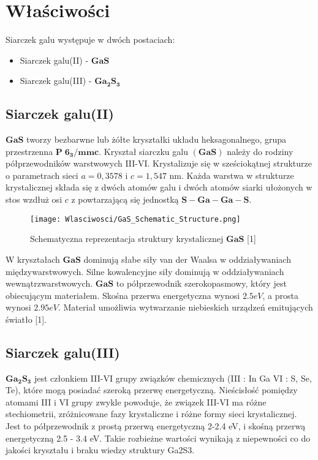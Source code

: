 \newpage

\section{Właściwości}
Siarczek galu występuje w dwóch postaciach:
\begin{itemize}
	\item Siarczek galu(II) - $\mathbf{GaS}$
	\item Siarczek galu(III) - $\mathbf{Ga_{2}S_{3}}$
\end{itemize}

\subsection{Siarczek galu(II)}
$\mathbf{GaS}$ tworzy bezbarwne lub żółte kryształki układu heksagonalnego, grupa przestrzenna
$\mathbf{P\;6_{3}/mmc}$. Kryształ siarczku galu $\mathbf{(GaS)}$ należy do rodziny półprzewodników warstwowych III-VI. Krystalizuje się w sześciokątnej strukturze o parametrach sieci $a = 0,3578$ i $c = 1,547$ nm. Każda warstwa w strukturze krystalicznej składa się z dwóch atomów galu i dwóch atomów siarki ułożonych w stos wzdłuż osi $c$ z powtarzającą się jednostką $\mathbf{S-Ga-Ga-S}$.
\begin{figure}[H]
	\begin{center}
		\texttt{[image: Wlasciwosci/GaS\_Schematic\_Structure.png]}
		\caption{Schematyczna reprezentacja struktury krystalicznej $\mathbf{GaS}$ [1]}
	\end{center}
\end{figure}
W kryształach $\mathbf{GaS}$ dominują słabe siły van der Waalsa w oddziaływaniach międzywarstwowych. Silne kowalencyjne siły dominują w oddziaływaniach wewnątrzwarstwowych.
$\mathbf{GaS}$ to półprzewodnik szerokopasmowy, który jest obiecującym materiałem. Skośna przerwa energetyczna wynosi $2.5eV$, a prosta wynosi $2.95eV$. Materiał umożliwia
wytwarzanie niebieskich urządzeń emitujących światło [1].

\newpage

\subsection{Siarczek galu(III)}
$\mathbf{Ga_{2}S_{3}}$ jest członkiem III-VI grupy związków chemicznych (III : In Ga VI : S, Se, Te), które mogą posiadać szeroką przerwę energetyczną. 
Nieścisłość pomiędzy atomami III i VI grupy zwykle powoduje, że związek III-VI ma różne stechiometrii, zróżnicowane fazy krystaliczne i różne formy sieci krystalicznej. Jest to półprzewodnik z prostą przerwą energetyczną 2-2.4 eV, i skośną przerwą energetyczną 2.5 - 3.4 eV. Takie rozbieżne wartości wynikają z
niepewności co do jakości kryształu i braku wiedzy struktury Ga2S3.

